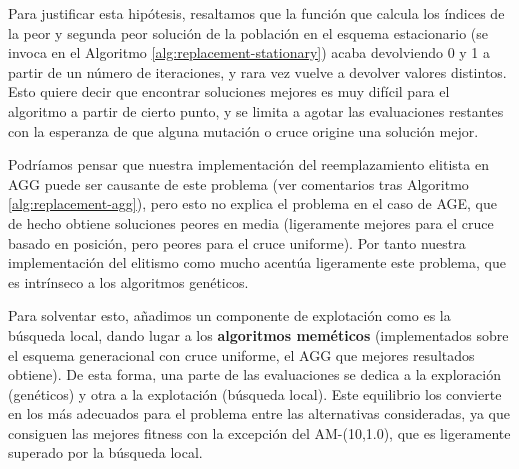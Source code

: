 \documentclass{article}
\begin{document}
Para justificar esta hipótesis, resaltamos que la función que calcula los índices de la peor y segunda peor solución de la población en
el esquema estacionario (se invoca en el Algoritmo \ref{alg:replacement-stationary}) acaba devolviendo 0 y 1 a partir
de un número de iteraciones, y rara vez vuelve a devolver valores distintos. Esto quiere decir que encontrar soluciones
mejores es muy difícil para el algoritmo a partir de cierto punto, y se limita a agotar las evaluaciones restantes
con la esperanza de que alguna mutación o cruce origine una solución mejor.

Podríamos pensar que nuestra implementación del reemplazamiento elitista en AGG puede ser causante de este problema
(ver comentarios tras Algoritmo \ref{alg:replacement-agg}), pero esto no explica el problema en el caso de AGE, que
de hecho obtiene soluciones peores en media (ligeramente mejores para el cruce basado en posición, pero peores
para el cruce uniforme). Por tanto nuestra implementación del elitismo como mucho acentúa ligeramente este problema,
que es intrínseco a los algoritmos genéticos.

Para solventar esto, añadimos un componente de explotación como es la búsqueda local, dando lugar a los \textbf{algoritmos
meméticos} (implementados sobre el esquema generacional con cruce uniforme, el AGG que mejores resultados obtiene).
De esta forma, una parte de las evaluaciones se dedica a la exploración (genéticos) y otra a la explotación (búsqueda local). Este
equilibrio los convierte en los más adecuados para el problema entre las alternativas consideradas, ya que consiguen las mejores
fitness con la excepción del AM-(10,1.0), que es ligeramente superado por la búsqueda local.
\end{document}
